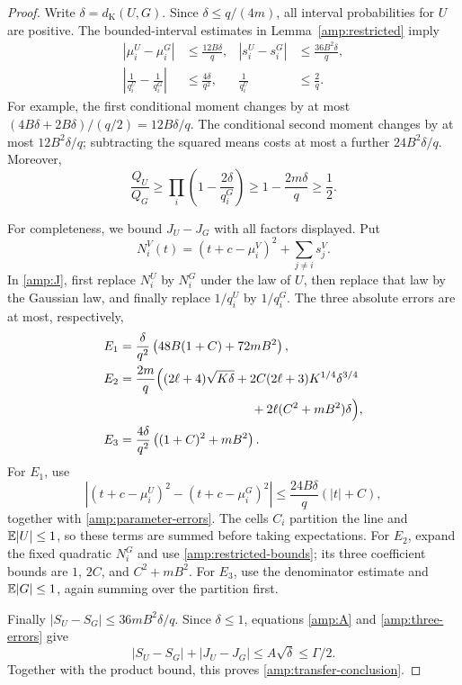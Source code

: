 \begin{proof}
Write $\delta=d_{\mathrm K}(U,G)$.  Since $\delta\le q/(4m)$,
all interval probabilities for $U$ are positive.  The bounded-interval
estimates in Lemma~\ref{amp:restricted} imply
\begin{align}
 |\mu_i^U-\mu_i^G|&\le\frac{12B\delta}{q},&
 |s_i^U-s_i^G|&\le\frac{36B^2\delta}{q},\\
 \left|\frac1{q_i^U}-\frac1{q_i^G}\right|&\le\frac{4\delta}{q^2},&
 \frac1{q_i^U}&\le\frac2q.
 \label{amp:parameter-errors}
\end{align}
For example, the first conditional moment changes by at most
$(4B\delta+2B\delta)/(q/2)=12B\delta/q$.  The conditional
second moment changes by at most $12B^2\delta/q$; subtracting the
squared means costs at most a further $24B^2\delta/q$.
Moreover,
\[
 \frac{Q_U}{Q_G}
 \ge\prod_i\left(1-\frac{2\delta}{q_i^G}\right)
 \ge1-\frac{2m\delta}{q}\ge\frac12.
\]

For completeness, we bound $J_U-J_G$ with all factors displayed.
Put
\[
 N_i^V(t)=(t+c-\mu_i^V)^2+\sum_{j\ne i}s_j^V.
\]
In \eqref{amp:J}, first replace $N_i^U$ by $N_i^G$ under the law
of $U$, then replace that law by the Gaussian law, and finally replace
$1/q_i^U$ by $1/q_i^G$.  The three absolute errors are at most,
respectively,
\begin{align}
 E_1&=\frac{\delta}{q^2}
                 \left(48B(1+C)+72mB^2\right),\\
 E_2&=\frac{2m}{q}\Bigl((2\ell+4)\sqrt{K\delta}
       +2C(2\ell+3)K^{1/4}\delta^{3/4}\notag\\
    &\hspace{37mm}+2\ell(C^2+mB^2)\delta\Bigr),\\
 E_3&=\frac{4\delta}{q^2}\left((1+C)^2+mB^2\right).
 \label{amp:three-errors}
\end{align}
For $E_1$, use
\[
 |(t+c-\mu_i^U)^2-(t+c-\mu_i^G)^2|
 \le\frac{24B\delta}{q}(|t|+C),
\]
together with \eqref{amp:parameter-errors}.  The cells $C_i$ partition
the line and $\mathbb E|U|\le1$, so these terms are summed before taking
expectations.  For $E_2$, expand the fixed quadratic $N_i^G$ and use
\eqref{amp:restricted-bounds}; its three coefficient bounds are
$1$, $2C$, and $C^2+mB^2$.  For $E_3$, use the denominator estimate
and $\mathbb E|G|\le1$, again summing over the partition first.

Finally $|S_U-S_G|\le36mB^2\delta/q$.  Since
$\delta\le1$, equations \eqref{amp:A} and \eqref{amp:three-errors}
give
\[
 |S_U-S_G|+|J_U-J_G|\le A\sqrt\delta\le\Gamma/2.
\]
Together with the product bound, this proves
\eqref{amp:transfer-conclusion}.
\end{proof}

